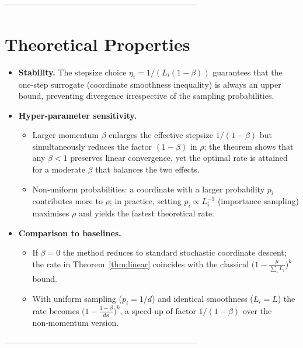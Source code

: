 \documentclass{article}
\begin{document}
-----------------------------------------------------------------------

\section*{Theoretical Properties}
\begin{itemize}
\item \textbf{Stability.}  The stepsize choice \(\eta_{i}=1/(L_{i}(1-\beta))\)
guarantees that the one‑step surrogate (coordinate smoothness inequality)
is always an upper bound, preventing divergence irrespective of the
sampling probabilities.

\item \textbf{Hyper‑parameter sensitivity.}
  \begin{itemize}
  \item Larger momentum \(\beta\) enlarges the effective stepsize
    \(1/(1-\beta)\) but simultaneously reduces the factor \((1-\beta)\)
    in \(\rho\); the theorem shows that any \(\beta<1\) preserves linear
    convergence, yet the optimal rate is attained for a moderate
    \(\beta\) that balances the two effects.
  \item Non‑uniform probabilities: a coordinate with a larger
    probability \(p_{i}\) contributes more to \(\rho\); in practice,
    setting \(p_{i}\propto L_{i}^{-1}\) (importance sampling) maximises
    \(\rho\) and yields the fastest theoretical rate.
  \end{itemize}

\item \textbf{Comparison to baselines.}
  \begin{itemize}
  \item If \(\beta=0\) the method reduces to standard stochastic
    coordinate descent; the rate in Theorem~\ref{thm:linear}
    coincides with the classical \(\bigl(1-\frac{\mu}{\sum_{i}L_{i}}\bigr)^{k}\)
    bound.
  \item With uniform sampling (\(p_{i}=1/d\)) and identical smoothness
    (\(L_{i}=L\)) the rate becomes \(\bigl(1-\frac{1-\beta}{d\kappa}\bigr)^{k}\),
    a speed‑up of factor \(1/(1-\beta)\) over the non‑momentum version.
  \end{itemize}
\end{itemize}

-----------------------------------------------------------------------
\end{document}

